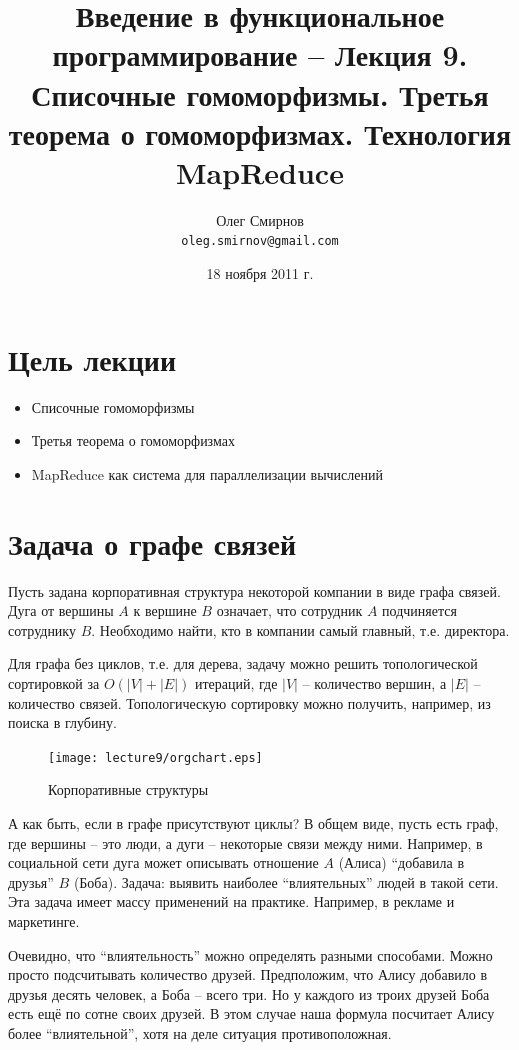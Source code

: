 \documentclass[a4paper,11pt]{article}
\author{Олег Смирнов\\
\texttt{oleg.smirnov@gmail.com}}
\date{18 ноября 2011 г.}
\title{Введение в функциональное программирование -- Лекция 9. Списочные
гомоморфизмы. Третья теорема о гомоморфизмах. Технология MapReduce}
\begin{document}
\maketitle
\tableofcontents
\newpage

\section*{Цель лекции}
\begin{itemize}
\item Списочные гомоморфизмы
\item Третья теорема о гомоморфизмах
\item MapReduce как система для параллелизации вычислений
\end{itemize}

\section{Задача о графе связей}
Пусть задана корпоративная структура некоторой компании в виде графа связей.
Дуга от вершины $A$ к вершине $B$ означает, что сотрудник $A$ подчиняется 
сотруднику $B$. Необходимо найти, кто в компании самый главный, т.е. директора.

Для графа без циклов, т.е. для дерева, задачу можно решить топологической
сортировкой за $O(|V| + |E|)$ итераций, где $|V|$ -- количество вершин, а
$|E|$ -- количество связей. Топологическую сортировку можно получить, например,
из поиска в глубину.

\begin{figure}[h]
    \begin{center}
        \texttt{[image: lecture9/orgchart.eps]}
        \caption{Корпоративные структуры}
    \end{center}
\end{figure}

А как быть, если в графе присутствуют циклы? В общем виде, пусть есть граф,
где вершины -- это люди, а дуги -- некоторые связи между ними. Например,
в социальной сети дуга может описывать отношение $A$ (Алиса) ``добавила в 
друзья'' $B$ (Боба). Задача: выявить наиболее ``влиятельных'' людей в такой
сети. Эта задача имеет массу применений на практике. Например, в рекламе и
маркетинге.

Очевидно, что ``влиятельность'' можно определять разными способами. Можно просто
подсчитывать количество друзей. Предположим, что Алису добавило в друзья
десять человек, а Боба -- всего три. Но у каждого из троих друзей Боба есть
ещё по сотне своих друзей. В этом случае наша формула посчитает Алису более
``влиятельной'', хотя на деле ситуация противоположная.
\end{document}
